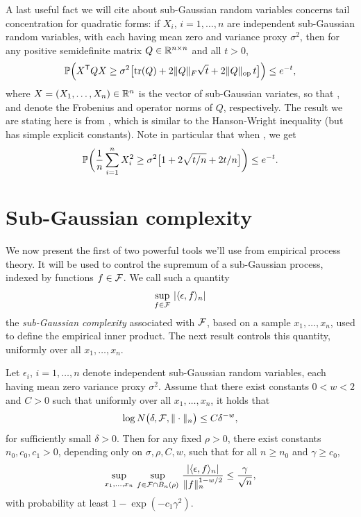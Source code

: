 \documentclass{article}
\begin{document}
A last useful fact we will cite about sub-Gaussian random variables concerns
tail concentration for quadratic forms: if $X_i$, $i=1,\dots,n$ are independent
sub-Gaussian random variables, with each having mean zero and variance proxy 
$\sigma^2$, then for any positive semidefinite matrix $Q \in \mathbb{R}^{n \times n}$
and all $t>0$,    
\begin{equation}
\label{eq:sg_quadratic}
\P\Big( X^\T Q X \geq \sigma^2 \big[ \tr(Q) + 2 \|Q\|_F {\sqrt t} + 2 
\|Q\|_{\mathrm{op}} \, t \big] \Big) \leq e^{-t},
\end{equation}
where $X = (X_1,\dots,X_n) \in \mathbb{R}^n$ is the vector of sub-Gaussian variates, so 
that , and  denote the Frobenius and operator norms of $Q$, 
respectively. The result we are stating here is from \citet{hsu2012tail}, which
is similar to the Hanson-Wright inequality (but has simple explicit constants).       
Note in particular that when , we get
\begin{equation}
\label{eq:sg_sum_squares}
\P\bigg( \frac{1}{n} \sum_{i=1}^n X_i^2 \geq \sigma^2 \big[ 1 + 2 \sqrt{t/n} +
2t/n \big] \bigg) \leq e^{-t}.  
\end{equation}

\section{Sub-Gaussian complexity}

We now present the first of two powerful tools we'll use from empirical process
theory. It will be used to control the supremum of a sub-Gaussian process,
indexed by functions $f \in \mathcal{F}$. We call such a quantity   
\[
\sup_{f \in \mathcal{F}} \, |\langle \epsilon, f \rangle_n|
\]
the \emph{sub-Gaussian complexity} associated with $\mathcal{F}$, based on a sample 
$x_1,\dots,x_n$, used to define the empirical inner product. The next result
controls this quantity, uniformly over all $x_1,\dots,x_n$. 

\begin{lemma} 
\label{lem:sg_complexity}
Let $\epsilon_i$, $i=1,\ldots,n$ denote independent sub-Gaussian random
variables, each having mean zero variance proxy $\sigma^2$. Assume that there
exist constants $0<w<2$ and $C>0$ such that uniformly over all $x_1,\dots,x_n$,
it holds that  
\begin{equation}
\label{eq:entropy_bd}
\log N\big(\delta, \cF, \|\cdot\|_n \big) \leq C \delta^{-w},
\end{equation}
for sufficiently small $\delta>0$. Then for any fixed $\rho>0$, there exist
constants $n_0,c_0,c_1>0$, depending only on $\sigma,\rho,C,w$, such that for
all $n \geq n_0$ and $\gamma \geq c_0$,  
\begin{equation}
\label{eq:sg_complexity}
\sup_{x_1,\dots,x_n} \, \sup_{f \in \cF \cap B_n(\rho)} \, \frac{|\langle
  \epsilon, f \rangle_n|}{\|f\|_n^{1-w/2}} \leq \frac{\gamma}{\sqrt n}, 
\end{equation}
with probability at least $1 - \exp(-c_1\gamma^2)$.
\end{lemma}
\end{document}
